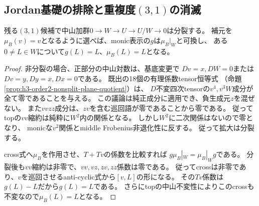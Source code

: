 \subsection{Jordan基礎の排除と重複度$(3,1)$の消滅}
\label{subsec:h3-positive3-Jordan-monic}
\begin{lemma}\label{lem:h3-positive3-AS3-split}
残る$(3,1)$候補で中山加群$0\to W\to U\to U/W\to0$は分裂する。
補元を$\mu_B(v)=v$となるように選べば、monic表示の$g$は$\mu_B|_W$と可換し、
ある$0\ne L\in W$について$g(L)=L$、$\mu_B(L)=L$となる。
\end{lemma}
\begin{proof}
非分裂の場合、正部分の中山対数は、基底変更で
$Dv=x,DW=0$または$Dv=y,Dy=x,Dx=0$である。
既出の18個の有理係数tensor恒等式
（命題\ref{prop:h3-order2-nonsplit-plane-quotient}）は、
$D$不変四次tensorの$v^4,v^3W$成分が全て零であることを与える。
この議論は純正成分に適用でき、負生成元$z$を混ぜない。
また$vvzz$成分は、$zv$を含む巡回語が零であることから零である。
従ってtopの$vv$縮約は純粋に$W^2$内の関係となる。
しかし$W^2$に二次関係はないので零となり、
monicな$v^2$関係とmiddle Frobenius非退化性に反する。
従って拡大は分裂する。

cross式へ$\mu_B$を作用させ、$T+Tv$の係数を比較すれば
$g\mu_B|_W=\mu_B|_W g$である。
分裂後も$vv$縮約は非零で、$vv,vz,zv,zz$係数は零である。
従ってcrossは非零であり、$v$を巡回させるanti-cyclic式から$[v,L]$の形になる。
その$Tv$係数は$g(L)-L$だから$g(L)=L$である。
さらにtopの中山不変性によりこのcrossも不変なので$\mu_B(L)=L$となる。
\end{proof}

